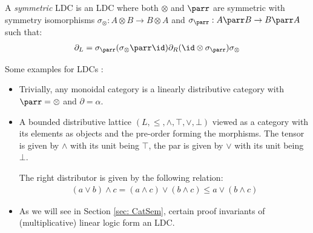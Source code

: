 \documentclass[DIN, pagenumber=false, fontsize=11pt, parskip=half, colorinlistoftodos, svgnames]{scrartcl}
\begin{document}
\begin{definition}
\begin{itemize}
\begin{center}
				\end{center}
		\end{itemize}
		
		A \emph{symmetric} LDC is an LDC where both $\otimes$ and $\parr$ are symmetric with symmetry isomorphisms 
		$\sigma_\otimes : A \otimes B \rightarrow B \otimes A $ 
		and 
		$\sigma_\parr : A \parr B \rightarrow B \parr A $ 
		such that:
		\begin{align*}
			\partial_L = \sigma_\parr (\sigma_\otimes \parr \id) \partial_R (\id \otimes \sigma_\parr) \sigma_\otimes
		\end{align*}
	\end{definition}
	
	\begin{example}
		Some examples for LDCs \cite[Definition 2.2]{srinavsan-thesis}:
		\begin{itemize}
			\item 
				Trivially, any monoidal category is a linearly distributive category with $\parr = \otimes$ and $\partial = \alpha$.
			\item 
				A bounded distributive lattice $(L, \leq, \wedge, \top, \vee, \bot ) $ viewed as a category with its elements as objects and the pre-order forming the morphisms. The tensor is given by $\wedge$ with its unit being $\top$, the par is given by $\vee$ with its unit being $\bot$.
				
				The right distributor is given by the following relation:
				\begin{align*}
					(a \vee b) \wedge c = (a \wedge c) \vee (b \wedge c) \leq a \vee (b \wedge c)
				\end{align*}
			\item 
				As we will see in Section \ref{sec: CatSem}, certain proof invariants of (multiplicative) linear logic form an LDC.

		\end{itemize}
	\end{example}
	
\end{document}
